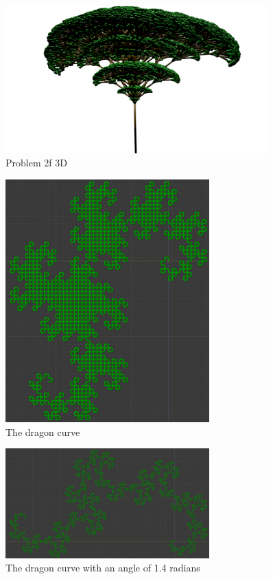 \begin{figure}[H]
    \centering
    \includegraphics[width=0.90\textwidth]{figures/L-systems/f3d.png}
    \caption{Problem 2f 3D}\label{fig:prob2f_3d}
\end{figure}

\begin{figure}[h]
    \centering
    \includegraphics[width=0.7\textwidth]{figures/L-systems/dragon.png}
    \caption{The dragon curve}
\end{figure}

\begin{figure}[h]
    \centering
    \includegraphics[width=0.7\textwidth]{figures/L-systems/dragon-1_4rad.png}
    \caption{The dragon curve with an angle of 1.4 radians}
\end{figure}

